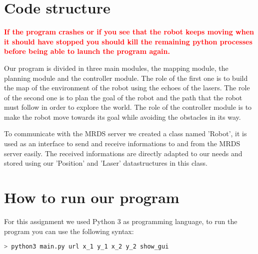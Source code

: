 \section{Code structure}

\textcolor{red}{\textbf{If the program crashes or if you see that the robot keeps moving when it should have stopped you should kill the remaining python processes before being able to launch the program again.}}

Our program is divided in three main modules, the mapping module, the planning module and the controller module.
The role of the first one is to build the map of the environment of the robot using the echoes of the lasers.
The role of the second one is to plan the goal of the robot and the path that the robot must follow in order to explore the world.
The role of the controller module is to make the robot move towards its goal while avoiding the obstacles in its way.

To communicate with the MRDS server we created a class named 'Robot', it is used as an interface to send and receive informations to and from the MRDS server easily.
The received informations are directly adapted to our needs and stored using our 'Position' and 'Laser' datastructures in this class.

\section{How to run our program}

For this assignment we used Python 3 as programming language, to run the program you can use the following syntax:

\begin{lstlisting}[language=bash]
> python3 main.py url x_1 y_1 x_2 y_2 show_gui
\end{lstlisting}
